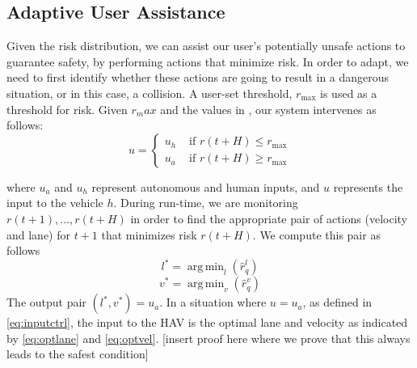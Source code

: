 \documentclass[letterpaper, 10 pt, conference]{ieeeconf}  %
\DeclareMathOperator*{\argmin}{arg\,min}
\newcommand\NB[1]{$\spadesuit$\footnote{NB: #1}}
\begin{document}


\subsection{Adaptive User Assistance}


Given the risk distribution, we can assist our user's potentially unsafe actions to guarantee safety, by performing actions that minimize risk. In order to adapt, we need to first identify whether these actions are going to result in a dangerous situation, or in this case, a collision. A user-set threshold, $r_\max$ is used as a threshold for risk. Given $r_max$ and the values in , our system intervenes as follows:
\begin{equation} \label{eq:inputctrl}
    u = \begin{cases}
    u_h & \text{ if } r(t+H)\leq r_\max \\
    u_a & \text{ if } r(t+H)\geq r_\max
    \end{cases}
\end{equation}

where $u_a$ and $u_h$ represent autonomous and human inputs, and $u$ represents the input to the vehicle $h$. During run-time, we are monitoring $r(t+1),...,r(t+H)$ in order to find the appropriate pair of actions (velocity and lane) for $t+1$ that minimizes risk $r(t+H)$. We compute this pair as follows
\begin{equation} \label{eq:optlane}
    l^* = \argmin_l(\hat{r}_q^l)
\end{equation}
\begin{equation} \label{eq:optvel}
    v^* = \argmin_v(\hat{r}_q^v)
\end{equation}
The output pair $(l^*,v^*)= u_a$. In a situation where $u = u_a$, as defined in \eqref{eq:inputctrl}, the input to the HAV is the optimal lane and velocity as indicated by \eqref{eq:optlane} and \eqref{eq:optvel}.
[insert proof here where we prove that this always leads to the safest condition]
\end{document}
